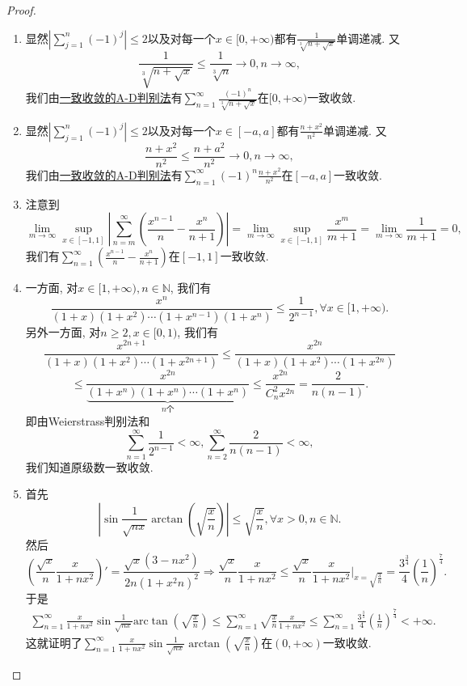 \documentclass[../../main.tex]{subfiles}
\begin{document}
\begin{proof}
\begin{enumerate}
\item 显然\(\left| \sum_{j=1}^{n} (-1)^j \right| \leqslant 2\)以及对每一个\(x \in [0, +\infty)\)都有\(\frac{1}{\sqrt[3]{n + \sqrt{x}}}\)单调递减. 又
\[
\frac{1}{\sqrt[3]{n + \sqrt{x}}} \leqslant \frac{1}{\sqrt[3]{n}} \to 0, n \to \infty,
\]
我们由\hyperref[theorem:级数一致收敛的A-D判别法]{一致收敛的A-D判别法}有\(\sum_{n=1}^{\infty} \frac{(-1)^n}{\sqrt[3]{n + \sqrt{x}}}\)在\([0, +\infty)\)一致收敛.

\item 显然\(\left| \sum_{j=1}^{n} (-1)^j \right| \leqslant 2\)以及对每一个\(x \in [-a, a]\)都有\(\frac{n + x^2}{n^2}\)单调递减. 又
\[
\frac{n + x^2}{n^2} \leqslant \frac{n + a^2}{n^2} \to 0, n \to \infty,
\]
我们由\hyperref[theorem:级数一致收敛的A-D判别法]{一致收敛的A-D判别法}有\(\sum_{n=1}^{\infty} (-1)^n \frac{n + x^2}{n^2}\)在\([-a, a]\)一致收敛.

\item 注意到
\[
\lim_{m \to \infty} \sup_{x \in [-1, 1]} \left| \sum_{n=m}^{\infty} \left( \frac{x^{n - 1}}{n} - \frac{x^n}{n + 1} \right) \right| = \lim_{m \to \infty} \sup_{x \in [-1, 1]} \frac{x^m}{m + 1} = \lim_{m \to \infty} \frac{1}{m + 1} = 0,
\]
我们有\(\sum_{n=1}^{\infty} \left( \frac{x^{n - 1}}{n} - \frac{x^n}{n + 1} \right)\)在\([-1, 1]\)一致收敛.

\item 一方面, 对\(x \in [1, +\infty), n \in \mathbb{N}\), 我们有
\[
\frac{x^n}{(1 + x)(1 + x^2) \cdots (1 + x^{n - 1})(1 + x^n)} \leqslant \frac{1}{2^{n - 1}}, \forall x \in [1, +\infty).
\]
另外一方面, 对\(n \geqslant 2, x \in [0, 1)\), 我们有
\[
\frac{x^{2n + 1}}{(1 + x)(1 + x^2) \cdots (1 + x^{2n + 1})} \leqslant \frac{x^{2n}}{(1 + x)(1 + x^2) \cdots (1 + x^{2n})}
\]
\[
\leqslant \frac{x^{2n}}{\underbrace{(1 + x^n)(1 + x^n) \cdots (1 + x^n)}_{n \text{个}}} \leqslant \frac{x^{2n}}{C_n^2 x^{2n}} = \frac{2}{n(n - 1)}.
\]
即由Weierstrass判别法和
\[
\sum_{n=1}^{\infty} \frac{1}{2^{n - 1}} < \infty, \sum_{n=2}^{\infty} \frac{2}{n(n - 1)} < \infty,
\]
我们知道原级数一致收敛.

\item 首先
\[
\left| \sin \frac{1}{\sqrt{nx}} \arctan \left( \sqrt{\frac{x}{n}} \right) \right| \leqslant \sqrt{\frac{x}{n}}, \forall x > 0, n \in \mathbb{N}.
\]
然后
\[
\left( \frac{\sqrt{x}}{n} \frac{x}{1 + nx^2} \right)' = \frac{\sqrt{x}(3 - nx^2)}{2n(1 + x^2 n)^2} \Rightarrow \frac{\sqrt{x}}{n} \frac{x}{1 + nx^2} \leqslant \frac{\sqrt{x}}{n} \frac{x}{1 + nx^2} \bigg|_{x = \sqrt{\frac{3}{n}}} = \frac{3^{\frac{3}{4}}}{4} \left( \frac{1}{n} \right)^{\frac{7}{4}}.
\]
于是
\begin{align*}
\sum_{n=1}^{\infty}{\frac{x}{1+nx^2}\sin \frac{1}{\sqrt{nx}}\mathrm{arc}\tan \left( \sqrt{\frac{x}{n}} \right)}\leqslant \sum_{n=1}^{\infty}{\sqrt{\frac{x}{n}}\frac{x}{1+nx^2}}\leqslant \sum_{n=1}^{\infty}{\frac{3^{\frac{3}{4}}}{4}\left( \frac{1}{n} \right) ^{\frac{7}{4}}}<+\infty.
\end{align*}
这就证明了\(\sum_{n=1}^{\infty} \frac{x}{1 + nx^2} \sin \frac{1}{\sqrt{nx}} \arctan \left( \sqrt{\frac{x}{n}} \right)\)在\((0, +\infty)\)一致收敛.


\end{enumerate}
\end{proof}
\end{document}

